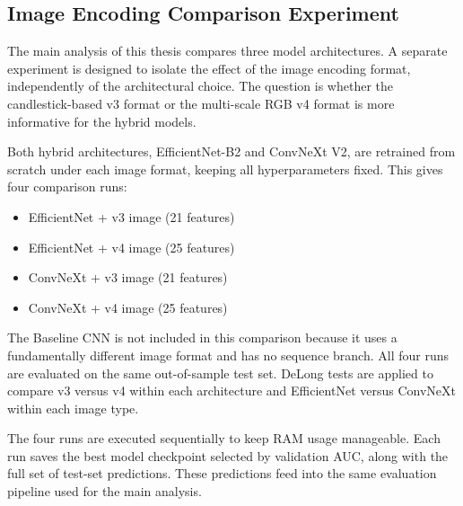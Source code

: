 \subsection{Image Encoding Comparison Experiment}
\label{sec:imgexp}

The main analysis of this thesis compares three model architectures. A separate experiment is designed to isolate the effect of the image encoding format, independently of the architectural choice. The question is whether the candlestick-based v3 format or the multi-scale RGB v4 format is more informative for the hybrid models.

Both hybrid architectures, EfficientNet-B2 and ConvNeXt V2, are retrained from scratch under each image format, keeping all hyperparameters fixed. This gives four comparison runs:

\begin{itemize}
    \item EfficientNet + v3 image (21 features)
    \item EfficientNet + v4 image (25 features)
    \item ConvNeXt + v3 image (21 features)
    \item ConvNeXt + v4 image (25 features)
\end{itemize}

The Baseline CNN is not included in this comparison because it uses a fundamentally different image format and has no sequence branch. All four runs are evaluated on the same out-of-sample test set. DeLong tests are applied to compare v3 versus v4 within each architecture and EfficientNet versus ConvNeXt within each image type.

The four runs are executed sequentially to keep RAM usage manageable. Each run saves the best model checkpoint selected by validation AUC, along with the full set of test-set predictions. These predictions feed into the same evaluation pipeline used for the main analysis.
